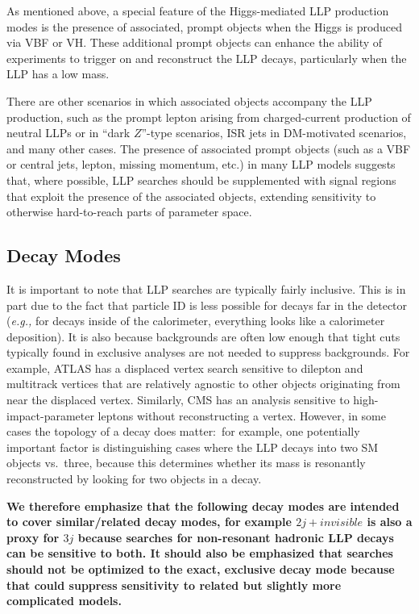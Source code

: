 %
 As  mentioned above, a special feature of the Higgs-mediated LLP production modes is the presence of associated, prompt objects when the Higgs is produced via VBF or VH. These additional prompt objects can enhance the ability of experiments to trigger on and reconstruct the LLP decays, particularly when the LLP has a low mass. 
 
 There are other scenarios in which associated objects accompany the LLP production, such as the prompt lepton arising from charged-current production of neutral LLPs or in ``dark $Z$''-type scenarios, ISR jets in DM-motivated scenarios, and many other cases. The presence of associated prompt objects (such as a VBF or central jets, lepton, missing momentum, etc.) in many LLP models suggests that, where possible, LLP searches should be supplemented with signal regions that exploit the presence of the associated objects, extending sensitivity to otherwise hard-to-reach parts of parameter space.

\subsection{Decay Modes}
It is important to note that LLP searches are typically fairly inclusive. This is in part due to the fact that particle ID is less possible for decays far in the detector (\emph{e.g.,} for decays inside of the calorimeter, everything looks like a calorimeter deposition). It is also because backgrounds are often low enough that tight cuts typically found in exclusive analyses are not needed to suppress backgrounds. For example, ATLAS has a displaced vertex search sensitive to dilepton and multitrack vertices that are relatively agnostic to other objects originating from near the displaced vertex. Similarly, CMS has an analysis sensitive to high-impact-parameter leptons without reconstructing a vertex.  However, in some cases the topology of a decay does matter:~for example, one potentially important factor is distinguishing cases where the LLP decays into two SM objects vs.~three, because this determines whether its mass is resonantly reconstructed by looking for two objects in a decay. 

{\bf We therefore emphasize that the following decay modes are intended to cover similar/related decay modes, for example $2j+invisible$ is also a proxy for $3j$ because searches for non-resonant hadronic LLP decays can be sensitive to both. It should also be emphasized that searches should not be optimized to the exact, exclusive decay mode because that could suppress sensitivity to related but slightly more complicated models.}

